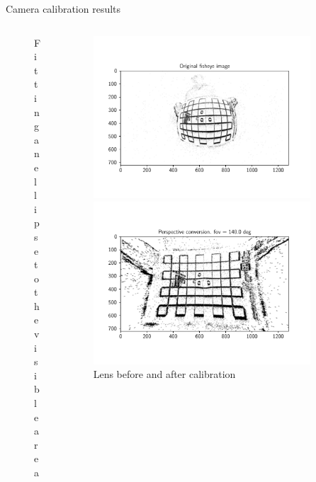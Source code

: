 \documentclass{beamer}
\begin{document}
\begin{frame}{Camera calibration results}
\begin{columns}[T]
\begin{column}{0.49\textwidth}
\begin{figure}
            \caption{Fitting an ellipse to the visible area}
            \label{fig:ellipse}
        \end{figure}
    \end{column}
    
    \begin{column}{0.49\textwidth}
        \vspace{-0.5cm}
        \begin{figure}
            \centering
            \includegraphics[width=0.9\textwidth]{./fig/pgfplot/build/ent_before.pdf}
            
            \vspace{-0.8cm}
            
            \includegraphics[width=0.9\textwidth]{./fig/pgfplot/build/ent_after.pdf}
            
            \caption{Lens before and after calibration}
            \label{fig:calib_after}
        \end{figure}
    \end{column}
\end{columns}

\end{frame}
\end{document}

